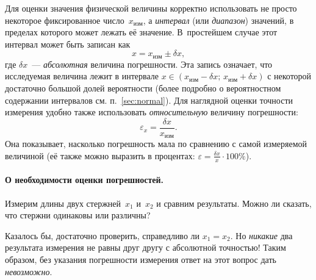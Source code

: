 
Для оценки значения физической величины корректно использовать
не просто некоторое фиксированное число~$x_{\text{изм}}$, а \emph{интервал} (или
\emph{диапазон}) значений, в пределах которого может лежать её
 значение. В~простейшем случае этот интервал
может быть записан как
\[
    x = x_{\text{изм}} \pm \delta x,
\]
где $\delta x$~--- \emph{абсолютная} величина погрешности.
Эта запись означает, что исследуемая величина лежит в интервале
$x \in (x_{\text{изм}} - \delta x;\, x_{\text{изм}} + \delta x)$
с некоторой достаточно большой долей вероятности (более подробно о
вероятностном содержании интервалов см. п.~\ref{sec:normal}).
Для наглядной оценки точности измерения удобно также использовать
\emph{относительную} величину погрешности:
\[
    \varepsilon_{x} = \frac{\delta x}{x_{\text{изм}}}.
\]
Она показывает, насколько погрешность мала по сравнению с
самой измеряемой величиной (её также можно выразить в процентах:
$\varepsilon = \frac{\delta x}{x} \cdot 100\%$).


\paragraph{О необходимости оценки погрешностей.}

Измерим длины двух стержней~$x_{1}$ и~$x_{2}$ и сравним результаты.
Можно ли сказать, что стержни одинаковы или различны?

Казалось бы,
достаточно проверить, справедливо ли $x_{1}=x_{2}$. Но \emph{никакие}
два результата измерения не равны друг другу с абсолютной точностью! Таким
образом, без указания погрешности измерения ответ на этот вопрос дать
\emph{невозможно}.

